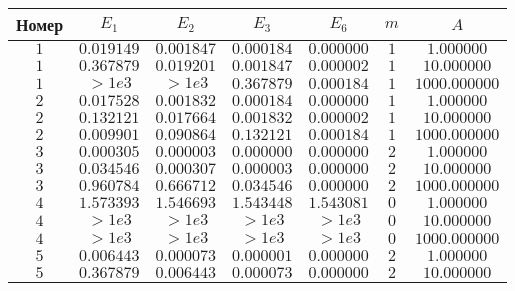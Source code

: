 \documentclass[14pt,a4paper]{extarticle}
\newcommand{\1}{\mathbbm{1}}
\begin{document}
\begin{table}[h!] 
    \begin{center} 
    \begin{tabular}{|c|c|c|c|c|c|c|} 
    \hline 
    Номер  & $E_1$ & $E_2$ & $E_3$ & $E_6$ & $m$ & $A$ \\ \hline
     $1$ &  $0.019149$ & $0.001847$ & $0.000184$ & $0.000000$ & $1$ & $1.000000$ \\ \hline 
    
     $1$ &  $0.367879$ & $0.019201$ & $0.001847$ & $0.000002$ & $1$ & $10.000000$ \\ \hline 
    
     $1$ &  $>1e3$ & $>1e3$ & $0.367879$ & $0.000184$ & $1$ & $1000.000000$ \\ \hline 
    
     $2$ &  $0.017528$ & $0.001832$ & $0.000184$ & $0.000000$ & $1$ & $1.000000$ \\ \hline 
    
     $2$ &  $0.132121$ & $0.017664$ & $0.001832$ & $0.000002$ & $1$ & $10.000000$ \\ \hline 
    
     $2$ &  $0.009901$ & $0.090864$ & $0.132121$ & $0.000184$ & $1$ & $1000.000000$ \\ \hline 
    
     $3$ &  $0.000305$ & $0.000003$ & $0.000000$ & $0.000000$ & $2$ & $1.000000$ \\ \hline 
    
     $3$ &  $0.034546$ & $0.000307$ & $0.000003$ & $0.000000$ & $2$ & $10.000000$ \\ \hline 
    
     $3$ &  $0.960784$ & $0.666712$ & $0.034546$ & $0.000000$ & $2$ & $1000.000000$ \\ \hline 
    
     $4$ &  $1.573393$ & $1.546693$ & $1.543448$ & $1.543081$ & $0$ & $1.000000$ \\ \hline 
    
     $4$ &  $>1e3$ & $>1e3$ & $>1e3$ & $>1e3$ & $0$ & $10.000000$ \\ \hline 
    
     $4$ &  $>1e3$ & $>1e3$ & $>1e3$ & $>1e3$ & $0$ & $1000.000000$ \\ \hline 
    
     $5$ &  $0.006443$ & $0.000073$ & $0.000001$ & $0.000000$ & $2$ & $1.000000$ \\ \hline 
    
     $5$ &  $0.367879$ & $0.006443$ & $0.000073$ & $0.000000$ & $2$ & $10.000000$ \\ \hline 
    

\end{tabular}
\end{center}
\end{table}
\end{document}
